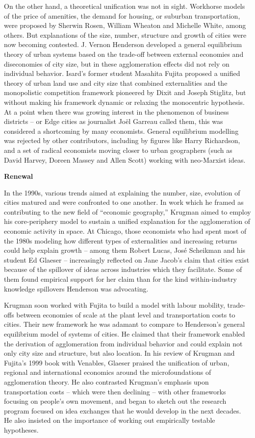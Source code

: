 \documentclass[
]{book}
\begin{document}
On the other hand, a theoretical unification was not in sight. Workhorse models of the price of amenities, the demand for housing, or suburban transportation, were proposed by Sherwin Rosen, William Wheaton and Michelle White, among others. But explanations of the size, number, structure and growth of cities were now becoming contested. J. Vernon Henderson developed a general equilibrium theory of urban systems based on the trade-off between external economies and diseconomies of city size, but in these agglomeration effects did not rely on individual behavior. Isard's former student Masahita Fujita proposed a unified theory of urban land use and city size that combined externalities and the monopolistic competition framework pioneered by Dixit and Joseph Stiglitz, but without making his framework dynamic or relaxing the monocentric hypothesis. At a point when there was growing interest in the phenomenon of business districts -- or Edge cities as journalist Joël Garreau called them, this was considered a shortcoming by many economists. General equilibrium modelling was rejected by other contributors, including by figures like Harry Richardson, and a set of radical economists moving closer to urban geographers (such as David Harvey, Doreen Massey and Allen Scott) working with neo-Marxist ideas.

\textbf{Renewal}

In the 1990s, various trends aimed at explaining the number, size, evolution of cities matured and were confronted to one another. In work which he framed as contributing to the new field of ``economic geography,'' Krugman aimed to employ his core-periphery model to sustain a unified explanation for the agglomeration of economic activity in space. At Chicago, those economists who had spent most of the 1980s modeling how different types of externalities and increasing returns could help explain growth -- among them Robert Lucas, José Scheikman and his student Ed Glaeser -- increasingly reflected on Jane Jacob's claim that cities exist because of the spillover of ideas across industries which they facilitate. Some of them found empirical support for her claim than for the kind within-industry knowledge spillovers Henderson was advocating.

Krugman soon worked with Fujita to build a model with labour mobility, trade-offs between economies of scale at the plant level and transportation costs to cities. Their new framework he was adamant to compare to Henderson's general equilibrium model of systems of cities. He claimed that their framework enabled the derivation of agglomeration from individual behavior and could explain not only city size and structure, but also location. In his review of Krugman and Fujita's 1999 book with Venables, Glaeser praised the unification of urban, regional and international economics around the microfoundations of agglomeration theory. He also contrasted Krugman's emphasis upon transportation costs -- which were then declining -- with other frameworks focusing on people's own movement, and began to sketch out the research program focused on idea exchanges that he would develop in the next decades. He also insisted on the importance of working out empirically testable hypotheses.
\end{document}
